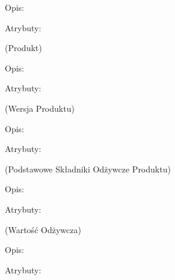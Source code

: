 \begin{enumerate}[label={\textbf{KAT/\protect\threedigits{\theenumi}}}, wide, labelwidth=!, labelindent=0pt, labelsep=0pt, series=reqs]
    Opis: \lipsum[1]
    \par
    Atrybuty:
    \begin{itemize}[series=atr]
         \label{kat:PricingTranslation:id}
         \label{kat:PricingTranslation:title}
         \label{kat:PricingTranslation:description}
         \label{kat:PricingTranslation:language}
    \end{itemize}

     \label{kat:Product} (Produkt)

    Opis: \lipsum[1]
    \par
    Atrybuty:
    \begin{itemize}[series=atr]
         \label{kat:Product:id}
         \label{kat:Product:source}
         \label{kat:Product:isPublic}
         \label{kat:Product:language}
    \end{itemize}

     \label{kat:ProductVersion} (Wersja Produktu)

    Opis: \lipsum[1]
    \par
    Atrybuty:
    \begin{itemize}[series=atr]
         \label{kat:ProductVersion:id}
         \label{kat:ProductVersion:createdDate}
         \label{kat:ProductVersion:description}
    \end{itemize}

     \label{kat:ProductBasicNutritionData} (Podstawowe Składniki Odżywcze Produktu)

    Opis: \lipsum[1]
    \par
    Atrybuty:
    \begin{itemize}[series=atr]
         \label{kat:ProductBasicNutritionData:id}
         \label{kat:ProductBasicNutritionData:energy}
         \label{kat:ProductBasicNutritionData:protein}
         \label{kat:ProductBasicNutritionData:fat}
         \label{kat:ProductBasicNutritionData:carbohydrates}
    \end{itemize}

     \label{kat:NutritionData} (Wartość Odżywcza)

    Opis: \lipsum[1]
    \par
    Atrybuty:
    \begin{itemize}[series=atr]
         \label{kat:NutritionData:id}
         \label{kat:NutritionData:nutritionValue}
    \end{itemize}


\end{enumerate}
